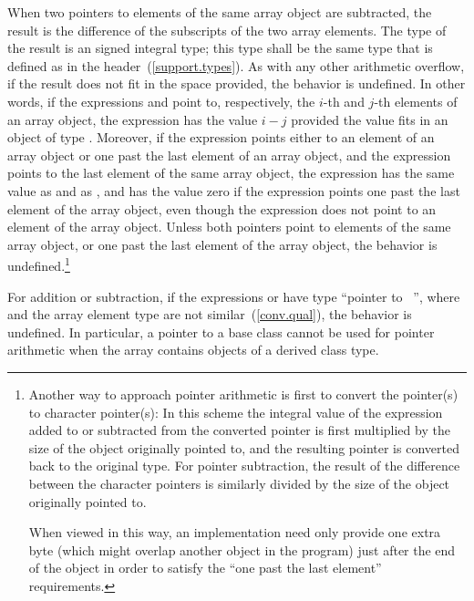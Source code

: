 \pnum
{}%
%
%
%
%
When two pointers to elements of the same array object are subtracted,
the result is the difference of the subscripts of the two array
elements. The type of the result is an  signed
integral type; this type shall be the same type that is defined as
 in the 
header~(\ref{support.types}). As with any other arithmetic overflow, if
the result does not fit in the space provided, the behavior is
undefined. In other words, if the expressions  and 
point to, respectively, the $i$-th and $j$-th elements of an array
object, the expression  has the value $i-j$ provided the
value fits in an object of type . Moreover, if the
expression  points either to an element of an array object or
one past the last element of an array object, and the expression
 points to the last element of the same array object, the
expression  has the same value as 
and as , and has the value zero if the expression
 points one past the last element of the array object, even
though the expression  does not point to an element of the
array object. Unless both pointers point to elements of the same array
object, or one past the last element of the array object, the behavior
is undefined.\footnote{Another way to approach pointer arithmetic is first to convert the
pointer(s) to character pointer(s): In this scheme the integral value of
the expression added to or subtracted from the converted pointer is
first multiplied by the size of the object originally pointed to, and
the resulting pointer is converted back to the original type. For
pointer subtraction, the result of the difference between the character
pointers is similarly divided by the size of the object originally
pointed to.

When viewed in this way, an implementation need only provide one extra
byte (which might overlap another object in the program) just after the
end of the object in order to satisfy the ``one past the last element''
requirements.}

\pnum
For addition or subtraction, if the expressions  or  have
type ``pointer to \cv\ '', where  and the array element type
are not similar~(\ref{conv.qual}), the behavior is undefined.
\enternote In particular, a pointer to a base class cannot be used for
pointer arithmetic when the array contains objects of a derived class type.
\exitnote

